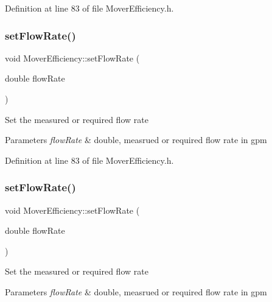 Definition at line 83 of file Mover\+Efficiency.\+h.

\mbox{\label{class_mover_efficiency_a35bf328fcd7e8334d552bce8b8704379}} 
\subsubsection{\texorpdfstring{set\+Flow\+Rate()}{setFlowRate()}\hspace{0.1cm}{\footnotesize\ttfamily [2/3]}}
{\footnotesize\ttfamily void Mover\+Efficiency\+::set\+Flow\+Rate (\begin{DoxyParamCaption}\item[{double}]{flow\+Rate }\end{DoxyParamCaption})\hspace{0.3cm}{\ttfamily [inline]}}

Set the measured or required flow rate 
\begin{DoxyParams}{Parameters}
{\em flow\+Rate} & double, measrued or required flow rate in gpm \\
\hline
\end{DoxyParams}


Definition at line 83 of file Mover\+Efficiency.\+h.

\mbox{\label{class_mover_efficiency_a35bf328fcd7e8334d552bce8b8704379}} 
\subsubsection{\texorpdfstring{set\+Flow\+Rate()}{setFlowRate()}\hspace{0.1cm}{\footnotesize\ttfamily [3/3]}}
{\footnotesize\ttfamily void Mover\+Efficiency\+::set\+Flow\+Rate (\begin{DoxyParamCaption}\item[{double}]{flow\+Rate }\end{DoxyParamCaption})\hspace{0.3cm}{\ttfamily [inline]}}

Set the measured or required flow rate 
\begin{DoxyParams}{Parameters}
{\em flow\+Rate} & double, measrued or required flow rate in gpm \\
\hline
\end{DoxyParams}


